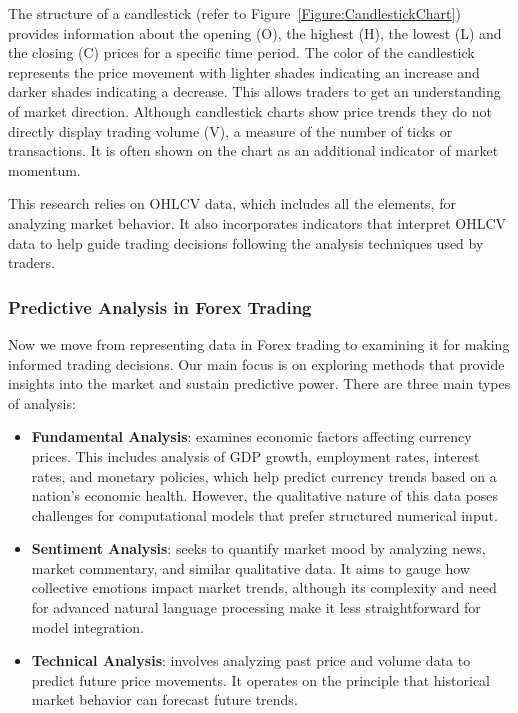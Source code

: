 The structure of a candlestick (refer to Figure~\ref{Figure:CandlestickChart}) provides information about the opening (O), the highest (H), the lowest (L) and the closing (C) prices for a specific time period. The color of the candlestick represents the price movement with lighter shades indicating an increase and darker shades indicating a decrease. This allows traders to get an understanding of market direction. Although candlestick charts show price trends they do not directly display trading volume (V), a measure of the number of ticks or transactions. It is often shown on the chart as an additional indicator of market momentum.

This research relies on OHLCV data, which includes all the elements, for analyzing market behavior. It also incorporates indicators that interpret OHLCV data to help guide trading decisions following the analysis techniques used by traders.

\subsubsection{Predictive Analysis in Forex Trading}
Now we move from representing data in Forex trading to examining it for making informed trading decisions. Our main focus is on exploring methods that provide insights into the market and sustain predictive power. There are three main types of analysis:

\begin{itemize}
\item \textbf{Fundamental Analysis}: examines economic factors affecting currency prices. This includes analysis of GDP growth, employment rates, interest rates, and monetary policies, which help predict currency trends based on a nation's economic health. However, the qualitative nature of this data poses challenges for computational models that prefer structured numerical input.
\item \textbf{Sentiment Analysis}: seeks to quantify market mood by analyzing news, market commentary, and similar qualitative data. It aims to gauge how collective emotions impact market trends, although its complexity and need for advanced natural language processing make it less straightforward for model integration.
\item \textbf{Technical Analysis}: involves analyzing past price and volume data to predict future price movements. It operates on the principle that historical market behavior can forecast future trends.
\end{itemize}


